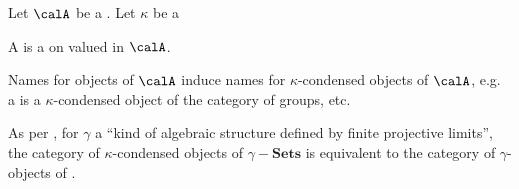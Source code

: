 \begin{definition} \label{definition:kappa_condensed_object_of_a_category_for_a_cardinal}
    Let $\calA$ be a . Let $\kappa$ be a 

    A  is a  on   valued in $\calA$.

    Names for objects of $\calA$ induce names for $\kappa$-condensed objects of $\calA$, e.g. a  is a $\kappa$-condensed object of the category of groups, etc.

    As per , for $\gamma$ a ``kind of algebraic structure defined by finite projective limits'', the category of $\kappa$-condensed objects of $\gamma-\mathbf{Sets}$ is equivalent to the category of $\gamma$-objects of .
\end{definition}